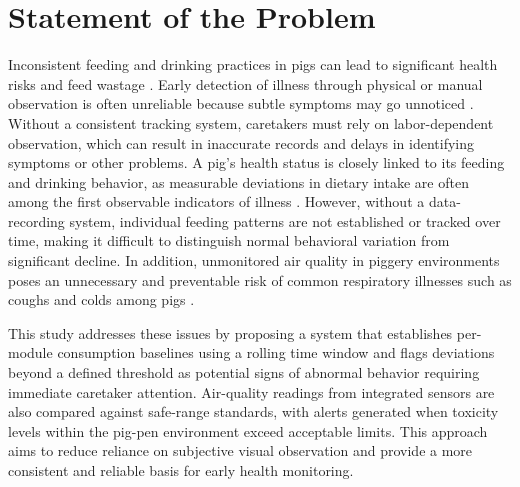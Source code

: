 \section{Statement of the Problem}

Inconsistent feeding and drinking practices in pigs can lead to significant health risks and feed wastage \cite{oecdfao2025outlook}. Early detection of illness through physical or manual observation is often unreliable because subtle symptoms may go unnoticed \cite{usda2026pork}. Without a consistent tracking system, caretakers must rely on labor-dependent observation, which can result in inaccurate records and delays in identifying symptoms or other problems. A pig's health status is closely linked to its feeding and drinking behavior, as measurable deviations in dietary intake are often among the first observable indicators of illness \cite{dingcong2017monitoring}. However, without a data-recording system, individual feeding patterns are not established or tracked over time, making it difficult to distinguish normal behavioral variation from significant decline. In addition, unmonitored air quality in piggery environments poses an unnecessary and preventable risk of common respiratory illnesses such as coughs and colds among pigs \cite{livestockproduction2026}.

This study addresses these issues by proposing a system that establishes per-module consumption baselines using a rolling time window and flags deviations beyond a defined threshold as potential signs of abnormal behavior requiring immediate caretaker attention. Air-quality readings from integrated sensors are also compared against safe-range standards, with alerts generated when toxicity levels within the pig-pen environment exceed acceptable limits. This approach aims to reduce reliance on subjective visual observation and provide a more consistent and reliable basis for early health monitoring.
